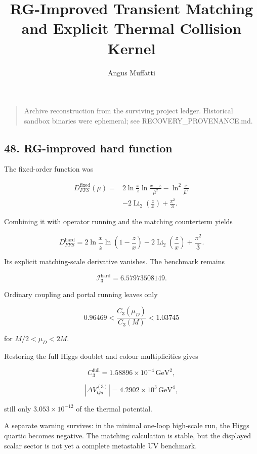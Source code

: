 \documentclass[
]{article}
\title{RG-Improved Transient Matching and Explicit Thermal Collision
Kernel}
\author{Angus Muffatti}
\date{}
\begin{document}
\maketitle

\begin{quote}
Archive reconstruction from the surviving project ledger. Historical
sandbox binaries were ephemeral; see RECOVERY\_PROVENANCE.md.
\end{quote}

\hypertarget{rg-improved-hard-function}{%
\subsection{48. RG-improved hard
function}\label{rg-improved-hard-function}}

The fixed-order function was

\[
\begin{aligned}
D_{FFS}^{\mathrm{fixed}}(\bar\mu)
={}&2\ln\frac xz\ln\frac{x-z}{\bar\mu^2}
-\ln^2\frac{x}{\bar\mu^2}\\
&-2\operatorname{Li}_2\left(\frac zx\right)
+\frac{\pi^2}{3}.
\end{aligned}
\]

Combining it with operator running and the matching counterterm yields

\[
\boxed{
D_{FFS}^{\mathrm{hard}}
=2\ln\frac xz\ln\left(1-\frac zx\right)
-2\operatorname{Li}_2\left(\frac zx\right)
+\frac{\pi^2}{3}.
}
\]

Its explicit matching-scale derivative vanishes. The benchmark remains

\[
\mathcal I_3^{\mathrm{hard}}=6.57973508149.
\]

Ordinary coupling and portal running leaves only

\[
0.96469<\frac{C_3(\mu_D)}{C_3(M)}<1.03745
\]

for \(M/2<\mu_D<2M\).

Restoring the full Higgs doublet and colour multiplicities gives

\[
C_3^{\mathrm{full}}=1.58896\times10^{-4}\,\mathrm{GeV}^2,
\]

\[
|\Delta V_{Qa}^{(3)}|
=4.2902\times10^3\,\mathrm{GeV}^4,
\]

still only \(3.053\times10^{-12}\) of the thermal potential.

A separate warning survives: in the minimal one-loop high-scale run, the
Higgs quartic becomes negative. The matching calculation is stable, but
the displayed scalar sector is not yet a complete metastable UV
benchmark.
\end{document}

